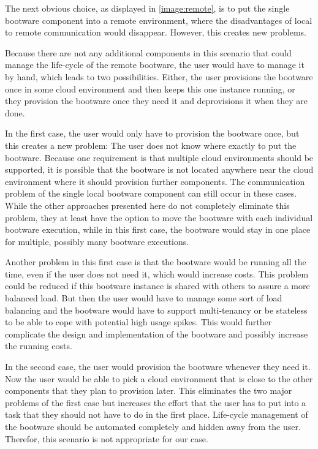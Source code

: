 The next obvious choice, as displayed in \autoref{image:remote}, is to put the single bootware component into a remote environment, where the disadvantages of local to remote communication would disappear.
However, this creates new problems.

Because there are not any additional components in this scenario that could manage the life-cycle of the remote bootware, the user would have to manage it by hand, which leads to two possibilities.
Either, the user provisions the bootware once in some cloud environment and then keeps this one instance running, or they provision the bootware once they need it and deprovisions it when they are done.

In the first case, the user would only have to provision the bootware once, but this creates a new problem: The user does not know where exactly to put the bootware.
Because one requirement is that multiple cloud environments should be supported, it is possible that the bootware is not located anywhere near the cloud environment where it should provision further components.
The communication problem of the single local bootware component can still occur in these cases.
While the other approaches presented here do not completely eliminate this problem, they at least have the option to move the bootware with each individual bootware execution, while in this first case, the bootware would stay in one place for multiple, possibly many bootware executions.

Another problem in this first case is that the bootware would be running all the time, even if the user does not need it, which would increase costs.
This problem could be reduced if this bootware instance is shared with others to assure a more balanced load.
But then the user would have to manage some sort of load balancing and the bootware would have to support multi-tenancy or be stateless to be able to cope with potential high usage spikes.
This would further complicate the design and implementation of the bootware and possibly increase the running costs.

In the second case, the user would provision the bootware whenever they need it. Now the user would be able to pick a cloud environment that is close to the other components that they plan to provision later.
This eliminates the two major problems of the first case but increases the effort that the user has to put into a task that they should not have to do in the first place.
Life-cycle management of the bootware should be automated completely and hidden away from the user.
Therefor, this scenario is not appropriate for our case.

